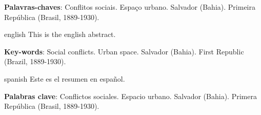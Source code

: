 
\setlength{\absparsep}{18pt} %
\begin{resumo}
 

 \textbf{Palavras-chaves}: Conflitos sociais. Espaço urbano. Salvador (Bahia). Primeira República (Brasil, 1889-1930).
\end{resumo}

\begin{resumo}[Abstract]
 \begin{otherlanguage*}{english}
   This is the english abstract.

   \vspace{\onelineskip}
 
   \noindent 
   \textbf{Key-words}: Social conflicts. Urban space. Salvador (Bahia). First Republic (Brazil, 1889-1930).
 \end{otherlanguage*}
\end{resumo}

% 

\begin{resumo}[Resumen]
 \begin{otherlanguage*}{spanish}
   Este es el resumen en español.
  
   \textbf{Palabras clave}: Conflictos sociales. Espacio urbano. Salvador (Bahia). Primera República (Brasil, 1889-1930).
 \end{otherlanguage*}
\end{resumo}
